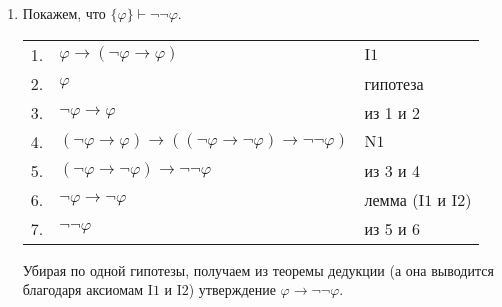 \documentclass[12pt,a4paper]{article}
\begin{document}
\begin{enumproblem}
\begin{enumerate}
            \item Покажем, что $\{\varphi\} \vdash \neg \neg \varphi$.
                \begin{center}
                    \begin{tabular}{rll}
                        1.& $\varphi \rightarrow (\neg \varphi \rightarrow \varphi)$& $\mathrm{I1}$\\
                        2.& $\varphi$& гипотеза\\
                        3.& $\neg \varphi \rightarrow \varphi$& из 1 и 2\\
                        4.& $(\neg \varphi \rightarrow \varphi) \rightarrow ((\neg \varphi \rightarrow \neg \varphi) \rightarrow \neg \neg \varphi)$& $\mathrm{N1}$\\
                        5.& $(\neg \varphi \rightarrow \neg \varphi) \rightarrow \neg \neg \varphi$& из 3 и 4\\
                        6.& $\neg \varphi \rightarrow \neg \varphi$& лемма ($\mathrm{I1}$ и $\mathrm{I2}$)\\
                        7.& $\neg \neg \varphi$& из 5 и 6\\
                    \end{tabular}
                \end{center}
                Убирая по одной гипотезы, получаем из теоремы дедукции (а она выводится благодаря аксиомам $\mathrm{I1}$ и $\mathrm{I2}$) утверждение $\varphi \rightarrow \neg \neg \varphi$.
        \end{enumerate}
    \end{enumproblem}
\end{document}
